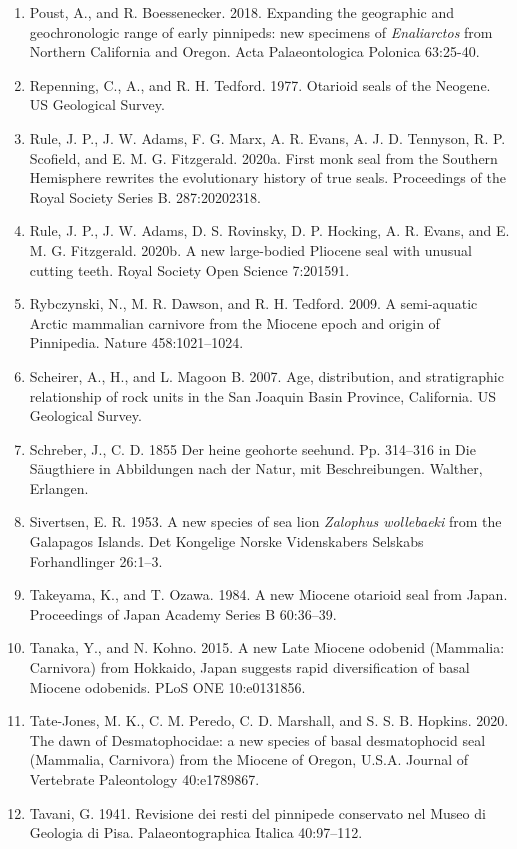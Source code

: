 \documentclass[a4paper, 12pt]{article}
\begin{document}
\begin{enumerate}
\item Poust, A., and R. Boessenecker. 2018. Expanding the geographic and geochronologic range of early pinnipeds: new specimens of \textit{Enaliarctos} from Northern California and Oregon. Acta Palaeontologica Polonica 63:25-40.
\item Repenning, C., A., and R. H. Tedford. 1977. Otarioid seals of the Neogene. US Geological Survey.
\item Rule, J. P., J. W. Adams, F. G. Marx, A. R. Evans, A. J. D. Tennyson, R. P. Scofield, and E. M. G. Fitzgerald. 2020a. First monk seal from the Southern Hemisphere rewrites the evolutionary history of true seals. Proceedings of the Royal Society Series B. 287:20202318.
\item Rule, J. P., J. W. Adams, D. S. Rovinsky, D. P. Hocking, A. R. Evans, and E. M. G. Fitzgerald. 2020b. A new large-bodied Pliocene seal with unusual cutting teeth. Royal Society Open Science 7:201591.
\item Rybczynski, N., M. R. Dawson, and R. H. Tedford. 2009. A semi-aquatic Arctic mammalian carnivore from the Miocene epoch and origin of Pinnipedia. Nature 458:1021–1024.
\item Scheirer, A., H., and L. Magoon B. 2007. Age, distribution, and stratigraphic relationship of rock units in the San Joaquin Basin Province, California. US Geological Survey.
\item Schreber, J., C. D. 1855 Der heine geohorte seehund. Pp. 314–316 in Die S\"{a}ugthiere in Abbildungen nach der Natur, mit Beschreibungen. Walther, Erlangen.
\item Sivertsen, E. R. 1953. A new species of sea lion \textit{Zalophus wollebaeki} from the Galapagos Islands. Det Kongelige Norske Videnskabers Selskabs Forhandlinger 26:1–3.
\item Takeyama, K., and T. Ozawa. 1984. A new Miocene otarioid seal from Japan. Proceedings of Japan Academy Series B 60:36–39.
\item Tanaka, Y., and N. Kohno. 2015. A new Late Miocene odobenid (Mammalia: Carnivora) from Hokkaido, Japan suggests rapid diversification of basal Miocene odobenids. PLoS ONE 10:e0131856.
\item Tate-Jones, M. K., C. M. Peredo, C. D. Marshall, and S. S. B. Hopkins. 2020. The dawn of Desmatophocidae: a new species of basal desmatophocid seal (Mammalia, Carnivora) from the Miocene of Oregon, U.S.A. Journal of Vertebrate Paleontology 40:e1789867.
\item Tavani, G. 1941. Revisione dei resti del pinnipede conservato nel Museo di Geologia di Pisa. Palaeontographica Italica 40:97–112.

\end{enumerate}
\end{document}
